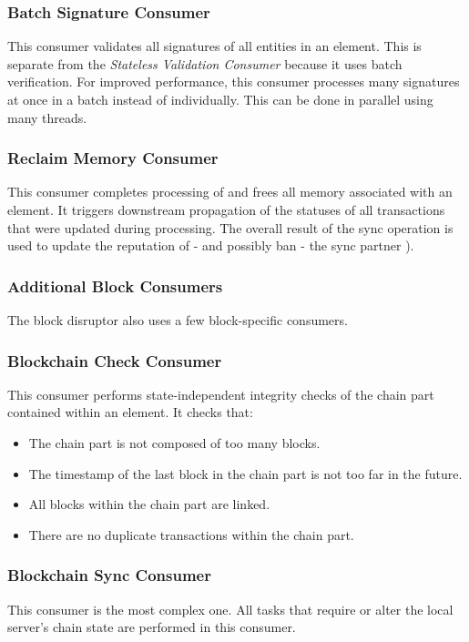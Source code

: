 \subsubsection*{Batch Signature Consumer}
This consumer validates all signatures of all entities in an element.
This is separate from the \emph{Stateless Validation Consumer} because it uses batch verification.
For improved performance, this consumer processes many signatures at once in a batch instead of individually.
This can be done in parallel using many threads.

\subsubsection*{Reclaim Memory Consumer}
This consumer completes processing of and frees all memory associated with an element.
It triggers downstream propagation of the statuses of all transactions that were updated during processing.
The overall result of the sync operation is used to update the reputation of - and possibly ban - the sync partner ).

\subsubsection{Additional Block Consumers}
\label{sec:disruptor:blockConsumers}
The block disruptor also uses a few block-specific consumers.

\subsubsection*{Blockchain Check Consumer}
This consumer performs state-independent integrity checks of the chain part contained within an element.
It checks that:
\begin{itemize}
	\item{The chain part is not composed of too many blocks.}
	\item{The timestamp of the last block in the chain part is not too far in the future.}
	\item{All blocks within the chain part are linked.}
	\item{There are no duplicate transactions within the chain part.}
\end{itemize}

\subsubsection*{Blockchain Sync Consumer}
This consumer is the most complex one.
All tasks that require or alter the local server's chain state are performed in this consumer.

